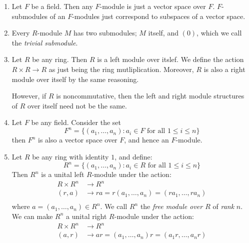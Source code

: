 \begin{example}\label{example_9.1}
  \begin{enumerate}
    \item[(1)] Let $F$ be a field. Then any $F$-module is just a
      vector space over $F$.  $F$-submodules of an $F$-modules just
      correspond to subspaces of a vector space.

    \item[(2)] Every $R$-module $M$ has two submodules; $M$ itself,
      and  $(0)$, which we call the \textit{trivial submodule}.

    \item[(3)] Let $R$ be any ring. Then $R$ is a left module
      over itslef. We define the action  $R \times R \xrightarrow{}
      R$ as just being the ring mutliplication. Moreover, $R$ is
      also a right module over itself by the same reasoning.

      However, if $R$ is noncommutative, then the left and right
      module structures of $R$ over itself need not be the same.

    \item[(4)] Let $F$ be any field. Consider the set
      \begin{equation*}
        F^n=\{(a_1, \dots, a_n) : a_i \in F \text{ for all } 1 \leq
        i  \leq n\}
      \end{equation*}
      then $F^n$ is also a vector space over $F$, and hence an
      $F$-module.

    \item[(5)] Let $R$ be any ring with identity $1$, and define:
      \begin{equation*}
        R^n=\{(a_1, \dots, a_n) : a_i \in R \text{ for all } 1 \leq
        i  \leq n\}
      \end{equation*}
      Then $R^n$ is a unital left $R$-module under the action:
      \begin{align*}
        R \times R^n &  \xrightarrow{} R^n  \\
        (r,a)  & \xrightarrow{} ra=r(a_1, \dots, a_n)=(ra_1, \dots, ra_n) \\
      \end{align*}
      where $a=(a_1, \dots, a_n) \in R^n$. We call $R^n$ the
      \textit{free module over $R$} of \textit{rank} $n$.
      We can make $R^n$ a unital right $R$-module under the action:
      \begin{align*}
        R \times R^n &  \xrightarrow{} R^n  \\
        (a,r)  & \xrightarrow{} ar=(a_1, \dots, a_n)r=(a_1r, \dots, a_nr) \\
      \end{align*}


\end{enumerate}
\end{example}
